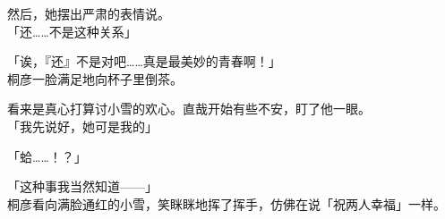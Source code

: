 然后，她摆出严肃的表情说。\\

「还……不是这种关系」

「诶，『还』不是对吧……真是最美妙的青春啊！」\\

桐彦一脸满足地向杯子里倒茶。

看来是真心打算讨小雪的欢心。直哉开始有些不安，盯了他一眼。\\

「我先说好，她可是我的」

「蛤……！？」

「这种事我当然知道——」\\

桐彦看向满脸通红的小雪，笑眯眯地挥了挥手，仿佛在说「祝两人幸福」一样。

